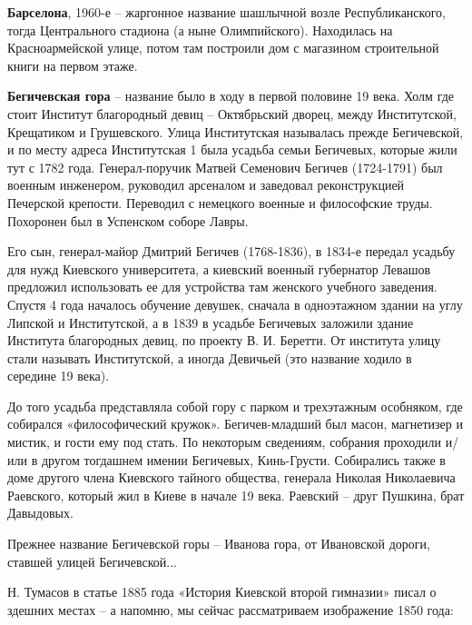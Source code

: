 \medskip


\textbf{Барселона}, 1960-е – жаргонное название шашлычной возле Республиканского, тогда Центрального стадиона (а ныне Олимпийского). Находилась на Красноармейской улице, потом там построили дом с магазином строительной книги на первом этаже.\\


\medskip


\textbf{Бегичевская гора} – название было в ходу в первой половине 19 века. Холм где стоит Институт благородный девиц – Октябрьский дворец, между Институтской, Крещатиком и Грушевского. Улица Институтская называлась прежде Бегичевской, и по месту адреса Институтская 1 была усадьба семьи Бегичевых, которые жили тут с 1782 года. Генерал-поручик Матвей Семенович Бегичев (1724-1791) был военным инженером, руководил арсеналом и заведовал реконструкцией Печерской крепости. Переводил с немецкого военные и философские труды. Похоронен был в Успенском соборе Лавры.

Его сын, генерал-майор Дмитрий Бегичев (1768-1836), в 1834-е передал усадьбу для нужд Киевского университета, а киевский военный губернатор Левашов предложил использовать ее для устройства там женского учебного заведения. Спустя 4 года началось обучение девушек, сначала в одноэтажном здании на углу Липской и Институтской, а в 1839 в усадьбе Бегичевых заложили здание Института благородных девиц, по проекту  В. И. Беретти. От института улицу стали называть Институтской, а иногда Девичьей (это название ходило в середине 19 века).

До того усадьба представляла собой гору с парком и трехэтажным особняком, где собирался «философический кружок». Бегичев-младший был масон, магнетизер и мистик, и гости ему под стать. По некоторым сведениям, собрания проходили и/или в другом тогдашнем имении Бегичевых, Кинь-Грусти. Собирались также в доме другого члена Киевского тайного общества, генерала Николая Николаевича Раевского, который жил в Киеве в начале 19 века. Раевский – друг Пушкина, брат Давыдовых.

Прежнее название Бегичевской горы – Иванова гора, от Ивановской дороги, ставшей улицей Бегичевской...

Н. Тумасов в статье 1885 года «История Киевской второй гимназии» писал о здешних местах – а напомню, мы сейчас рассматриваем изображение 1850 года:

